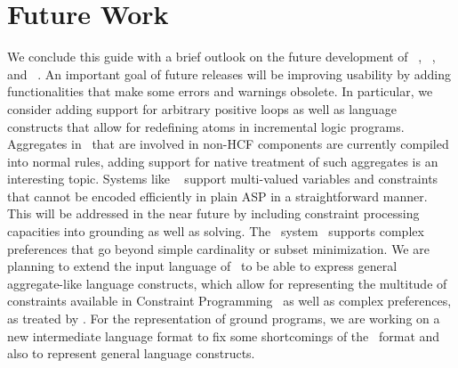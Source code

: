 \section{Future Work}\label{sec:future}

We conclude this guide with a brief outlook on the future development
of \gringo~\cite{gescth07a}, \clasp~\cite{gekasc09c}, and \clingo~\cite{gekakasc14b}.
An important goal of future releases will be improving usability
by adding functionalities that make some errors and warnings obsolete.
In particular, we consider adding support for arbitrary positive loops
as well as language constructs that allow for redefining atoms in incremental logic programs.
Aggregates in \clasp\ that are involved in non-HCF components are currently compiled into normal rules,
adding support for native treatment of such aggregates is an interesting topic.
Systems like \clingcon~\cite{geossc09a,ostsch12a} support multi-valued variables and constraints that cannot be encoded efficiently in plain ASP in a straightforward manner.
This will be addressed in the near future by including constraint processing capacities into grounding as well as solving.
The \asprin\ system~\cite{brderosc15a} supports complex preferences that go beyond simple cardinality or subset minimization.
We are planning to extend the input language of \gringo\ to be able to express general aggregate-like language constructs,
which allow for representing the multitude of constraints available in Constraint Programming~\cite{CPHandbook} 
as well as complex preferences, as treated by \asprin.
For the representation of ground programs,
we are working on a new intermediate language format to fix some shortcomings of the \smodels\ format
and also to represent general language constructs.

